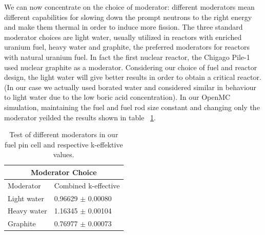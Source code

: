 \documentclass[twocolumn,a4paper,10pt]{article}
\begin{document}
\par
We can now concentrate on the choice of moderator: different moderators mean different capabilities for slowing down the prompt neutrons to the right energy and make them thermal in order to induce more fission. The three standard moderator choices are light water, usually utilized in reactors with enriched uranium fuel, heavy water and graphite, the preferred moderators for reactors with natural uranium fuel. In fact the first nuclear reactor, the Chigago Pile-1 used nuclear graphite as a moderator. Considering our choice of fuel and reactor design, the light water will give better results in order to obtain a critical reactor. (In our case we actually used borated water and considered similar in behaviour to light water due to the low boric acid concentration). In our OpenMC simulation, maintaining the fuel and fuel rod size constant and changing only the moderator yeilded the results shown in table ~\ref{table:moderators}.

\begin{table}[ht]
\centering
\begin{tabular}{ |m{2.5cm}||m{3.5cm}|}
  \hline
  \multicolumn{2}{|c|}{Moderator Choice} \\
  \hline
  \hline
  Moderator         &     Combined k-effective  \\
  \hline
  \hline
  Light water       &     0.96629 $\pm$ 0.00080   \\
  \hline
  Heavy water       &     1.16345 $\pm$ 0.00104   \\
  \hline
  Graphite          &     0.76977 $\pm$ 0.00073   \\
  \hline
\end{tabular}
\caption{Test of different moderators in our fuel pin cell and respective k-effektive values.}
\label{table:moderators}
\end{table}
\end{document}
